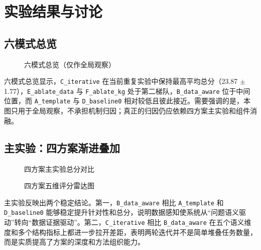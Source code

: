 \section{实验结果与讨论}

\subsection{六模式总览}

\begin{figure}[H]
\centering
{}
\caption{六模式总览（仅作全局观察）}
\label{fig:six-overview}
\end{figure}

六模式总览显示，\texttt{C\_iterative} 在当前重复实验中保持最高平均总分（23.87 $\pm$ 1.77），\texttt{E\_ablate\_data} 与 \texttt{F\_ablate\_kg} 处于第二梯队，\texttt{B\_data\_aware} 位于中间位置，而 \texttt{A\_template} 与 \texttt{D\_baseline0} 相对较低且彼此接近。需要强调的是，本图只用于全局观察，不承担机制归因；真正的归因仍应依赖四方案主实验和组件消融。

\subsection{主实验：四方案渐进叠加}

\begin{figure}[H]
\centering
{}
\caption{四方案主实验总分对比}
\label{fig:main-total}
\end{figure}

\begin{figure}[H]
\centering
{}
\caption{四方案五维评分雷达图}
\label{fig:main-radar}
\end{figure}


主实验反映出两个稳定结论。第一，\texttt{B\_data\_aware} 相比 \texttt{A\_template} 和 \texttt{D\_baseline0} 能够稳定提升针对性和总分，说明数据感知使系统从“问题语义驱动”转向“数据证据驱动”。第二，\texttt{C\_iterative} 相比 \texttt{B\_data\_aware} 在五个语义维度和多个结构指标上都进一步拉开差距，表明两轮迭代并不是简单堆叠任务数量，而是实质提高了方案的深度和方法组织能力。

